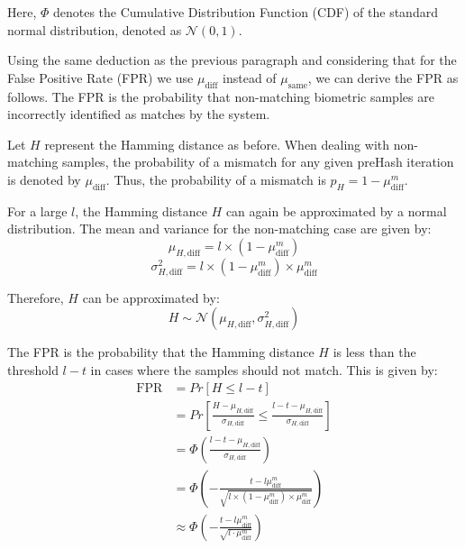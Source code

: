 Here, \(\Phi\) denotes the Cumulative Distribution Function (CDF) of the standard normal distribution, denoted as \(\mathcal{N}(0, 1)\).

Using the same deduction as the previous paragraph and considering that for the False Positive Rate (FPR) we use \(\mu_{\text{diff}}\) instead of \(\mu_{\text{same}}\), we can derive the FPR as follows. The FPR is the probability that non-matching biometric samples are incorrectly identified as matches by the system. 

Let \( H \) represent the Hamming distance as before. When dealing with non-matching samples, the probability of a mismatch for any given preHash iteration is denoted by \( \mu_{\text{diff}} \). Thus, the probability of a mismatch is \( p_H = 1 - \mu_{\text{diff}}^m \).

For a large \( l \), the Hamming distance \( H \) can again be approximated by a normal distribution. The mean and variance for the non-matching case are given by:
\[
\mu_{H, \text{diff}} = l \times (1 - \mu_{\text{diff}}^m)
\]
\[
\sigma_{H, \text{diff}}^2 = l \times (1 - \mu_{\text{diff}}^m) \times \mu_{\text{diff}}^m
\]

Therefore, \( H \) can be approximated by:
\[
H \sim \mathcal{N}(\mu_{H, \text{diff}}, \sigma_{H, \text{diff}}^2)
\]

The FPR is the probability that the Hamming distance \( H \) is less than the threshold \( l - t \) in cases where the samples should not match. This is given by:
\begin{equation}
\begin{aligned}
    \label{eq:fpr}
    \text{FPR} &= Pr[H \leq l - t] \\
    &= Pr\left[\frac{H - \mu_{H, \text{diff}}}{\sigma_{H, \text{diff}}} \leq \frac{l - t - \mu_{H, \text{diff}}}{\sigma_{H, \text{diff}}}\right] \\
    &= \Phi\left(\frac{l - t - \mu_{H, \text{diff}}}{\sigma_{H, \text{diff}}}\right) \\
    &= \Phi\left(-\frac{t - l\mu_{\text{diff}}^m}{\sqrt{l \times (1 - \mu_{\text{diff}}^m) \times \mu_{\text{diff}}^m}}\right)\\
    &\approx\Phi\left(-\frac{t - l\mu_{\text{diff}}^m}{\sqrt{l\cdot \mu_{\text{diff}}^m}}\right)
\end{aligned}
\end{equation}


